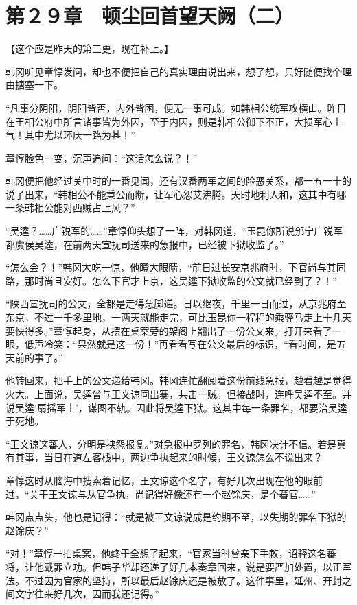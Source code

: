 \section{第２９章　顿尘回首望天阙（二）}

【这个应是昨天的第三更，现在补上。】

韩冈听见章惇发问，却也不便把自己的真实理由说出来，想了想，只好随便找个理由搪塞一下。

“凡事分阴阳，阴阳皆否，内外皆困，便无一事可成。如韩相公统军攻横山。昨日在王相公府中所言诸事皆为外因，至于内因，则是韩相公御下不正，大损军心士气！其中尤以环庆一路为甚！”

章惇脸色一变，沉声追问：“这话怎么说？！”

韩冈便把他经过关中时的一番见闻，还有汉番两军之间的险恶关系，都一五一十的说了出来，“韩相公不能秉公而断，让军心怨艾沸腾。天时地利人和，这其中有哪一条韩相公能对西贼占上风？”

“吴逵？……广锐军的……”章惇仰头想了一阵，对韩冈道，“玉昆你所说邠宁广锐军都虞侯吴逵，在前两天宣抚司送来的急报中，已经被下狱收监了。”

“怎么会？！”韩冈大吃一惊，他瞪大眼睛，“前日过长安京兆府时，下官尚与其同路，那时尚且安好。怎么下官才上京，这吴逵下狱收监的公文就已经到了？！”

“陕西宣抚司的公文，全都是走得急脚递。日以继夜，千里一日而过，从京兆府至东京，不过一千多里地，一两天就能走完，可比玉昆你一程程的乘驿马走上十几天要快得多。”章惇起身，从摆在桌案旁的架阁上翻出了一份公文来。打开来看了一眼，低声冷笑：“果然就是这一份！”再看看写在公文最后的标识，“看时间，是五天前的事了。”

他转回来，把手上的公文递给韩冈。韩冈连忙翻阅着这份前线急报，越看越是觉得火大。上面说，吴逵曾与王文谅同出寨，共击一贼。但接战时，连呼吴逵不至。并说吴逵‘扇摇军士’，谋图不轨。因此将吴逵下狱。这其中每一条罪名，都要治吴逵于死地。

“王文谅这蕃人，分明是挟怨报复。”对急报中罗列的罪名，韩冈决计不信。若是真有其事，当日在道左客栈中，两边争执起来的时候，王文谅怎么不说出来？

章惇这时从脑海中搜索着记忆，王文谅这个名字，有好几次出现在他的眼前过，“关于王文谅与从官争执，尚记得好像还有一个赵馀庆，是个蕃官……”

韩冈点点头，他也是记得：“就是被王文谅说成是约期不至，以失期的罪名下狱的赵馀庆？”

“对！”章惇一拍桌案，他终于全想了起来，“官家当时曾亲下手敇，诏释这名蕃将，让他戴罪立功。但韩子华却还递了好几本奏章回来，说是要严加处置，以正军法。不过因为官家的坚持，所以最后赵馀庆还是被放了。这件事里，延州、开封之间文字往来好几次，因而我还记得。”

